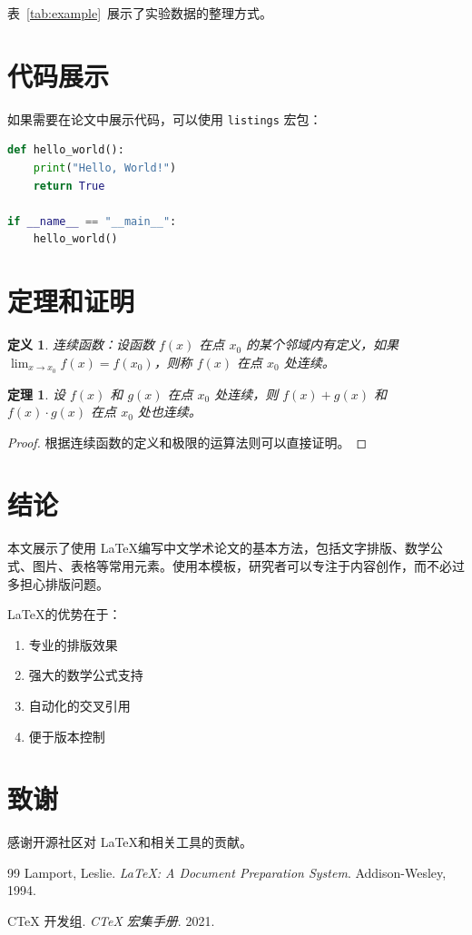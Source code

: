 \documentclass[12pt,a4paper]{article}
\begin{document}
表~\ref{tab:example}~展示了实验数据的整理方式。

\section{代码展示}

如果需要在论文中展示代码，可以使用 \texttt{listings} 宏包：

\begin{lstlisting}[language=Python, caption=Python代码示例]
def hello_world():
    print("Hello, World!")
    return True

if __name__ == "__main__":
    hello_world()
\end{lstlisting}

\section{定理和证明}

\newtheorem{theorem}{定理}
\newtheorem{lemma}{引理}
\newtheorem{definition}{定义}

\begin{definition}
连续函数：设函数 $f(x)$ 在点 $x_0$ 的某个邻域内有定义，如果 $\lim_{x \to x_0} f(x) = f(x_0)$，则称 $f(x)$ 在点 $x_0$ 处连续。
\end{definition}

\begin{theorem}
设 $f(x)$ 和 $g(x)$ 在点 $x_0$ 处连续，则 $f(x) + g(x)$ 和 $f(x) \cdot g(x)$ 在点 $x_0$ 处也连续。
\end{theorem}

\begin{proof}
根据连续函数的定义和极限的运算法则可以直接证明。
\end{proof}

\section{结论}

本文展示了使用 \LaTeX 编写中文学术论文的基本方法，包括文字排版、数学公式、图片、表格等常用元素。使用本模板，研究者可以专注于内容创作，而不必过多担心排版问题。

\LaTeX 的优势在于：
\begin{enumerate}
    \item 专业的排版效果
    \item 强大的数学公式支持
    \item 自动化的交叉引用
    \item 便于版本控制
\end{enumerate}

\section*{致谢}

感谢开源社区对 \LaTeX 和相关工具的贡献。

\begin{thebibliography}{99}
Lamport, Leslie. \textit{\LaTeX: A Document Preparation System}. Addison-Wesley, 1994.

CTeX 开发组. \textit{CTeX 宏集手册}. 2021.
\end{thebibliography}
\end{document}
